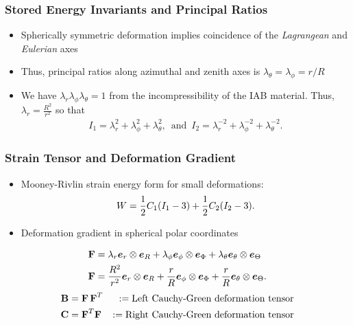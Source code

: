\begin{frame}
\frametitle{Stored Energy Invariants and Principal Ratios}
\begin{itemize}
	\item Spherically symmetric deformation implies coincidence of the \textit{Lagrangean} and \textit{Eulerian} axes 
	\vspace{0.1in}
	\item Thus, principal ratios  along azimuthal and zenith axes is $\lambda_\theta = \lambda_\phi = r/R$
	\vspace{0.1in}
	\item We have $\lambda_r\lambda_\phi\lambda_\theta=1$ from the incompressibility of the IAB material. Thus, $\lambda_r = \frac{R^2}{r^2}$ so that 
	\begin{align}
	I_1 = \lambda_r^2 + \lambda_\phi^2 + \lambda_\theta^2, \, \text{ and } \, I_2 =  \lambda_r^{-2} + \lambda_\phi^{-2} + \lambda_\theta^{-2}.
	\label{eq:invariants}
	\end{align}
\end{itemize} 
%
\end{frame}

\begin{frame}
	\frametitle{Strain Tensor and Deformation Gradient}
	\begin{itemize}
		\item Mooney-Rivlin strain energy form for small deformations:
		\begin{align}
		W = \frac{1}{2}C_1(I_1-3) + \frac{1}{2}C_2(I_2-3).
		\label{eq:Mooney}
		\end{align}
%
\vspace{0.1in}
%
		\item  Deformation gradient in spherical polar coordinates
	\end{itemize}
\begin{align}
\deformationgrad &= \lambda_r \basis_r \otimes \basis_R + \lambda_\phi \basis_\phi \otimes \basis_\Phi + \lambda_\theta \basis_\theta \otimes \basis_\Theta \nonumber \\
%
\deformationgrad &= \frac{R^2}{r^2}  \basis_r \otimes \basis_R + \frac{r}{R} \basis_\phi \otimes \basis_\Phi + \frac{r}{R} \basis_\theta \otimes \basis_\Theta.		
\label{eq:deformation_grad}
\end{align}
%
	\begin{align}
	\textbf{B}   &= \textbf{F} \, \textbf{F}^T &:= \text{Left Cauchy-Green deformation tensor} \nonumber \\ 
	\textbf{C} &= \textbf{F}^T\textbf{F} &:= \text{Right Cauchy-Green deformation tensor}  \nonumber
	\end{align}
\end{frame}

